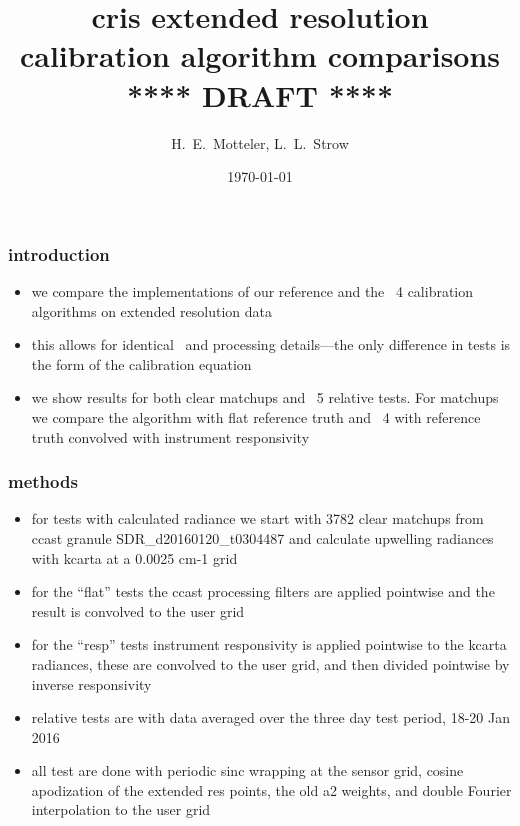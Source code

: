 \documentclass[11pt]{beamer}
\title{cris extended resolution \\
       calibration algorithm comparisons \\
\vspace{4mm}
{****} DRAFT {****} \\
}
\author{H.~E.~Motteler, L.~L.~Strow}
\institute{
  UMBC Atmospheric Spectroscopy Lab \\
  Joint Center for Earth Systems Technology \\
}
\date{\today}
\begin{document}
\begin{frame}[plain]
\titlepage
\end{frame}
\begin{frame}
\frametitle{introduction}

\begin{itemize}

  \item we compare the {\umbc} {\ccast} implementations of our
    reference and the \noaa~4 calibration algorithms on extended
    resolution data

  \item this allows for identical \ils\ and processing details---the
    only difference in tests is the form of the calibration equation

  \item we show results for both clear matchups and \fov~5 relative
    tests.  For matchups we compare the {\ccast} algorithm with flat
    reference truth and \noaa~4 with reference truth convolved with
    instrument responsivity

\end{itemize}

\end{frame}
\begin{frame}
\frametitle{methods}

\begin{itemize}

  \item for tests with calculated radiance we start with 3782 clear
    matchups from ccast granule SDR\_d20160120\_t0304487 and
    calculate upwelling radiances with kcarta at a 0.0025 cm-1 grid

  \item for the ``flat'' tests the ccast processing filters are
    applied pointwise and the result is convolved to the {\cris}
    user grid

  \item for the ``resp'' tests instrument responsivity is applied
    pointwise to the kcarta radiances, these are convolved to the
    user grid, and then divided pointwise by inverse responsivity

  \item relative tests are with data averaged over the three day
    test period, 18-20 Jan 2016
    
  \item all test are done with periodic sinc wrapping at the sensor
    grid, cosine apodization of the extended res points, the old a2
    weights, and double Fourier interpolation to the user grid

\end{itemize}

\end{frame}
\end{document}

